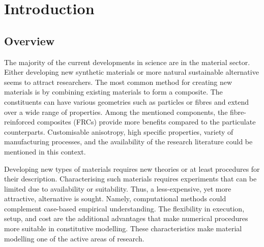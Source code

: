 
\chapter{Introduction}\label{chap:intro}

\section{Overview}
	The majority of the current developments in science are in the material sector. Either developing new synthetic materials or more natural sustainable alternative seems to attract researchers. The most common method for creating new materials is by combining existing materials to form a composite. The constituents can have various geometries such as particles or fibres and extend over a wide range of properties. Among the mentioned components, the fibre-reinforced composites (FRCs) provide more benefits compared to the particulate counterparts. Customisable anisotropy, high specific properties, variety of manufacturing processes, and the availability of the research literature could be mentioned in this context.
	
	Developing new types of materials requires new theories or at least procedures for their description. Characterising such materials requires experiments that can be limited due to availability or suitability. Thus, a less-expensive, yet more attractive, alternative is sought. Namely, computational methods could complement case-based empirical understanding. The flexibility in execution, setup, and cost are the additional advantages that make numerical procedures more suitable in constitutive modelling. These characteristics make material modelling one of the active areas of research.

	
